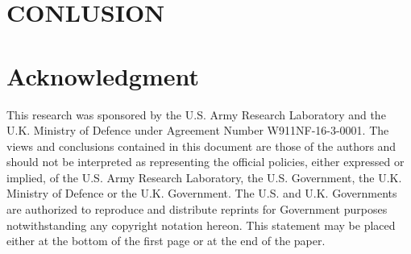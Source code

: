 \documentclass[conference]{IEEEtran}
\begin{document}
\section{CONLUSION}

\section*{Acknowledgment}
This research was sponsored by the U.S. Army Research Laboratory and the U.K. Ministry of Defence under Agreement Number W911NF-16-3-0001. The views and conclusions contained in this document are those of the authors and should not be interpreted as representing the official policies, either expressed or implied, of the U.S. Army Research Laboratory, the U.S. Government, the U.K. Ministry of Defence or the U.K. Government. The U.S. and U.K. Governments are authorized to reproduce and distribute reprints for Government purposes notwithstanding any copyright notation hereon. This statement may be placed either at the bottom of the first page or at the end of the paper.

\end{document}
